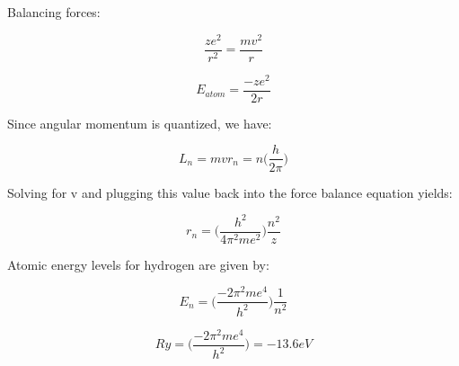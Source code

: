 Balancing forces:

\begin{equation}
\frac{ze^2}{r^2} = \frac{mv^2}{r}
\end{equation}

\begin{equation}
E_{atom} = \frac{-ze^2}{2r}
\end{equation}

Since angular momentum is quantized, we have:

\begin{equation}
L_n = mvr_n = n\big(\frac{h}{2\pi}\big)
\end{equation}

Solving for v and plugging this value back into the force balance equation yields:

\begin{equation}
r_n = \big(\frac{h^2}{4\pi^2me^2}\big)\frac{n^2}{z}
\end{equation}

Atomic energy levels for hydrogen are given by:

\begin{equation}
E_n = \big(\frac{-2\pi^2me^4}{h^2}\big)\frac{1}{n^2}
\end{equation}

\begin{equation}
Ry = \big(\frac{-2\pi^2me^4}{h^2}\big) = -13.6eV
\end{equation}



